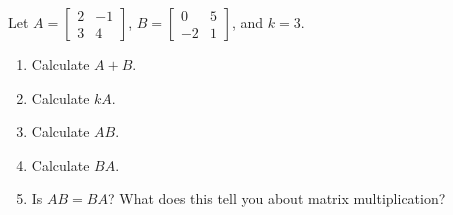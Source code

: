 \bigskip

\begin{problem}
Let $A = \begin{bmatrix} 2 & -1 \\ 3 & 4 \end{bmatrix}$, \;
$B = \begin{bmatrix} 0 & 5 \\ -2 & 1 \end{bmatrix}$, \; and $k = 3$.

\begin{enumerate}[label=\textbf{(\alph*)}]
  \item Calculate $A + B$.
  \item Calculate $kA$.
  \item Calculate $AB$.
  \item Calculate $BA$.
  \item Is $AB = BA$? What does this tell you about matrix multiplication?
\end{enumerate}
\end{problem}

